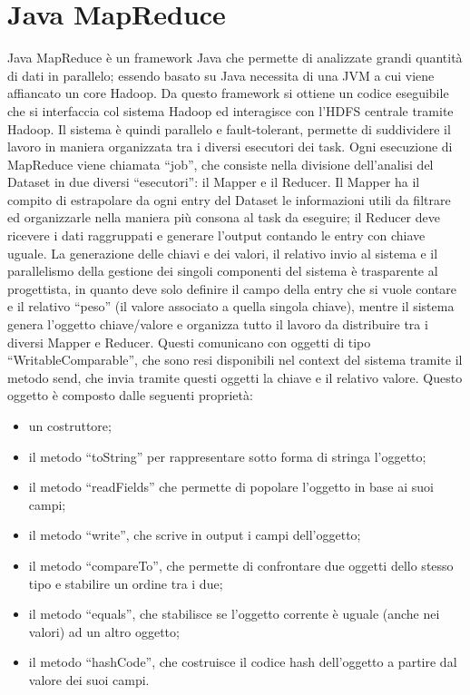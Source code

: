 \documentclass[11pt]{article} %
\begin{document}
\section{Java MapReduce}

Java MapReduce è un framework Java che permette di analizzate grandi quantità di dati in parallelo; essendo basato su Java necessita di una JVM a cui viene affiancato un core Hadoop. Da questo framework si ottiene un codice eseguibile che si interfaccia col sistema Hadoop ed interagisce con l'HDFS centrale tramite Hadoop. Il sistema è quindi parallelo e fault-tolerant, permette di suddividere il lavoro in maniera organizzata tra i diversi esecutori dei task. Ogni esecuzione di MapReduce viene chiamata ``job'', che consiste nella divisione dell'analisi del Dataset in due diversi ``esecutori'': il Mapper e il Reducer. Il Mapper ha il compito di estrapolare da ogni entry del Dataset le informazioni utili da filtrare ed organizzarle nella maniera più consona al task da eseguire; il Reducer deve ricevere i dati raggruppati e generare l'output contando le entry con chiave uguale. La generazione delle chiavi e dei valori, il relativo invio al sistema e il parallelismo della gestione dei singoli componenti del sistema è trasparente al progettista, in quanto deve solo definire il campo della entry che si vuole contare e il relativo ``peso'' (il valore associato a quella singola chiave), mentre il sistema genera l'oggetto chiave/valore e organizza tutto il lavoro da distribuire tra i diversi Mapper e Reducer.  Questi comunicano con oggetti di tipo ``WritableComparable'', che sono resi disponibili nel context del sistema tramite il metodo send, che invia tramite questi oggetti la chiave e il relativo valore. Questo oggetto è composto dalle seguenti proprietà:
\begin{itemize}
\item  un costruttore; 
\item il metodo ``toString'' per rappresentare sotto forma di stringa l'oggetto; 
\item il metodo ``readFields'' che permette di popolare l'oggetto in base ai suoi campi; 
\item il metodo ``write'', che scrive in output i campi dell'oggetto; 
\item il metodo ``compareTo'', che permette di confrontare due oggetti dello stesso tipo e stabilire un ordine tra i due;
\item il metodo ``equals'', che stabilisce se l'oggetto corrente è uguale (anche nei valori) ad un altro oggetto;
\item il metodo ``hashCode'', che costruisce il codice hash dell'oggetto a partire dal valore dei suoi campi.
\end{itemize}
\end{document}
